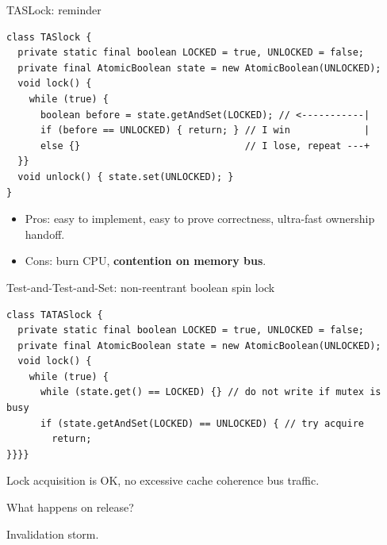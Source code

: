 \begin{frame}[fragile]{TASLock: reminder}

\begin{verbatim}
class TASlock {
  private static final boolean LOCKED = true, UNLOCKED = false;
  private final AtomicBoolean state = new AtomicBoolean(UNLOCKED);
  void lock() {
    while (true) {
      boolean before = state.getAndSet(LOCKED); // <-----------|
      if (before == UNLOCKED) { return; } // I win             |
      else {}                             // I lose, repeat ---+      
  }}
  void unlock() { state.set(UNLOCKED); }
}
\end{verbatim}

\begin{itemize}
  \item Pros: easy to implement, easy to prove correctness, ultra-fast ownership handoff.
  \item Cons: burn CPU, \textbf{contention on memory bus}.
\end{itemize}
\end{frame}


\begin{frame}[fragile]{Test-and-Test-and-Set: non-reentrant boolean spin lock}

\begin{verbatim}
class TATASlock {
  private static final boolean LOCKED = true, UNLOCKED = false;
  private final AtomicBoolean state = new AtomicBoolean(UNLOCKED);
  void lock() {
    while (true) {
      while (state.get() == LOCKED) {} // do not write if mutex is busy 
      if (state.getAndSet(LOCKED) == UNLOCKED) { // try acquire
        return;
}}}}
\end{verbatim}

\pause
Lock acquisition is OK, no excessive cache coherence bus traffic.

\pause
What happens on release?

\pause
Invalidation storm.

\end{frame}


